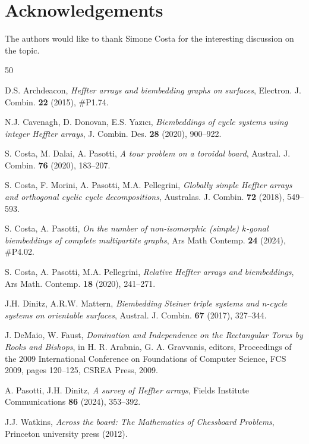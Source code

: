 \documentclass{amsart}
\theoremstyle{definition}
\numberwithin{equation}{section}
\begin{document}
\section*{Acknowledgements}
 The authors would like to thank Simone Costa for the interesting discussion on the topic.

\begin{thebibliography}{50}

 D.S. Archdeacon,
\textit{Heffter arrays and biembedding graphs on surfaces},
Electron. J. Combin. \textbf{22} (2015), \#P1.74.


 N.J. Cavenagh, D. Donovan, E.S. Yazıcı, \emph{Biembeddings of cycle systems using integer Heffter arrays}, J. Combin. Des. \textbf{28} (2020), 900--922.


 S. Costa, M. Dalai, A. Pasotti,
\textit{A tour problem on a toroidal board},
Austral. J. Combin. \textbf{76} (2020), 183--207.


 S. Costa, F. Morini, A. Pasotti, M.A. Pellegrini, \emph{Globally simple Heffter arrays and orthogonal cyclic cycle decompositions}, Australas. J. Combin. \textbf{72} (2018), 549--593.

 S. Costa, A. Pasotti, \emph{On the number of non-isomorphic (simple) $k$-gonal biembeddings of complete multipartite graphs}, Ars Math Contemp. \textbf{24} (2024), \#P4.02.

 S. Costa, A. Pasotti, M.A. Pellegrini, \emph{Relative Heffter arrays and biembeddings}, Ars Math. Contemp. \textbf{18} (2020), 241--271.

 J.H. Dinitz, A.R.W. Mattern, \emph{Biembedding Steiner triple systems and n-cycle systems on orientable surfaces}, Austral. J. Combin. \textbf{67} (2017), 327--344.

J. DeMaio, W. Faust, \textit{Domination and Independence on the Rectangular Torus by Rooks and Bishops},  in H. R. Arabnia, G. A. Gravvanis, editors, Proceedings of the 2009 International Conference on Foundations of Computer Science, FCS 2009, pages 120--125, CSREA Press, 2009. 

A. Pasotti, J.H. Dinitz,
\textit{A survey of Heffter arrays},
Fields Institute Communications \textbf{86} (2024), 353--392.

J.J. Watkins, \textit{Across the board: The Mathematics of Chessboard Problems}, Princeton university press (2012).





\end{thebibliography}
\end{document}
